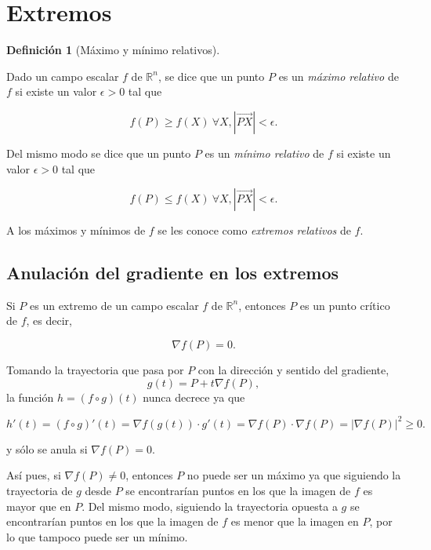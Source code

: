 \documentclass[
  a4paper,
]{scrreport}
\theoremstyle{plain}
\theoremstyle{plain}
\theoremstyle{definition}
\newtheorem{definition}{Definición}[chapter]
\theoremstyle{definition}
\theoremstyle{plain}
\theoremstyle{definition}
\theoremstyle{remark}
\begin{document}
\hypertarget{extremos}{%
\section{Extremos}\label{extremos}}

\begin{definition}[Máximo y mínimo
relativos]\protect\hypertarget{def-extremos-relativos}{}\label{def-extremos-relativos}

Dado un campo escalar \(f\) de \(\mathbb{R}^n\), se dice que un punto
\(P\) es un \emph{máximo relativo} de \(f\) si existe un valor
\(\epsilon>0\) tal que

\[f(P)\geq f(X)\ \forall X, |\vec{PX}|<\epsilon.\]

Del mismo modo se dice que un punto \(P\) es un \emph{mínimo relativo}
de \(f\) si existe un valor \(\epsilon>0\) tal que

\[f(P)\leq f(X)\ \forall X, |\vec{PX}|<\epsilon.\]

A los máximos y mínimos de \(f\) se les conoce como \emph{extremos
relativos} de \(f\).

\end{definition}

\hypertarget{anulaciuxf3n-del-gradiente-en-los-extremos}{%
\subsection{Anulación del gradiente en los
extremos}\label{anulaciuxf3n-del-gradiente-en-los-extremos}}

Si \(P\) es un extremo de un campo escalar \(f\) de \(\mathbb{R}^n\),
entonces \(P\) es un punto crítico de \(f\), es decir,

\[\nabla f(P) = 0.\]

Tomando la trayectoria que pasa por \(P\) con la dirección y sentido del
gradiente, \[g(t)=P+t\nabla f(P),\] la función \(h=(f\circ g)(t)\) nunca
decrece ya que

\[h'(t)= (f\circ g)'(t) = \nabla f(g(t))\cdot g'(t) = \nabla f(P)\cdot \nabla f(P) = |\nabla f(P)|^2\geq 0.\]

y sólo se anula si \(\nabla f(P)=0\).

Así pues, si \(\nabla f(P)\neq 0\), entonces \(P\) no puede ser un
máximo ya que siguiendo la trayectoria de \(g\) desde \(P\) se
encontrarían puntos en los que la imagen de \(f\) es mayor que en \(P\).
Del mismo modo, siguiendo la trayectoria opuesta a \(g\) se encontrarían
puntos en los que la imagen de \(f\) es menor que la imagen en \(P\),
por lo que tampoco puede ser un mínimo.
\end{document}
